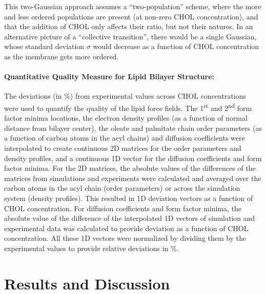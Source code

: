 \documentclass[journal=jctcce]{achemso}
\begin{document}
This two-Gaussian approach assumes a ``two-population'' scheme, where the more and less ordered populations are present (at non-zero CHOL concentration), and that the addition of CHOL only affects their ratio, but not their natures. In an alternative picture of a ``collective transition'', there would be a single Gaussian, whose standard deviation $\sigma$ would decrease as a function of CHOL concentration as the membrane gets more ordered.

\paragraph{Quantitative Quality Measure for Lipid Bilayer Structure:} The deviations (in \%) from experimental values across CHOL concentrations were used to quantify the quality of the lipid force fields. 
The 1\textsuperscript{st} and 2\textsuperscript{nd} form factor minima locations, the electron density profiles (as a function of normal distance from bilayer center), the oleate and palmitate chain order parameters (as a function of carbon atoms in the acyl chains) and diffusion coefficients were interpolated to create continuous 2D matrices for the order parameters and density profiles, and a continuous 1D vector for the diffusion coefficients and form factor minima. For the 2D matrices, the absolute values of the differences of the matrices from simulations and experiments were calculated and averaged over the carbon atoms in the acyl chain (order parameters) or across the simulation system (density profiles). This resulted in 1D deviation vectors as a function of CHOL concentration. For diffusion coefficients and form factor minima, the absolute value of the difference of the interpolated 1D vectors of simulation and experimental data was calculated to provide deviation as a function of CHOL concentration. All these 1D vectors were normalized by dividing them by the experimental values to provide relative deviations in \%.

\section{Results and Discussion}

\\
\\
\\
\end{document}
